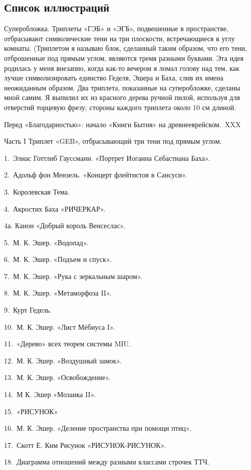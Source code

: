\subsection{Список иллюстраций}

Суперобложка. Триплеты «ГЭБ» и «ЭГБ», подвешенные в пространстве, отбрасывают символические тени на три плоскости, встречающиеся в углу комнаты. (Триплетом я называю блок, сделанный таким образом, что его тени, отброшенные под прямым углом, являются тремя разными буквами. Эта идея родилась у меня внезапно, когда как-то вечером я ломал голову над тем, как лучше символизировать единство Геделя, Эшера и Баха, слив их имена неожиданным образом. Два триплета, показанные на суперобложке, сделаны мной самим. Я выпилил их из красного дерева ручной пилой, используя для отверстий торцевую фрезу; стороны каждого триплета около 10 см длиной.

Перед «Благодарностью»: начало «Книги Бытия» на древнееврейском.~XXX

Часть I Триплет «GEB», отбрасывающий три тени под прямым углом.

1.~Элиас Готтлиб Гауссманн. «Портрет Иоганна Себастиана Баха».

2.~Адольф фон Мензель. «Концерт флейтистов в Сансуси».

3.~Королевская Тема.

4.~Акростих Баха «РИЧЕРКАР».

4а. Канон «Добрый король Венсеслас».

5.~М. К. Эшер. «Водопад».

6.~М. К. Эшер. «Подъем и спуск».

7.~М. К. Эшер. «Рука с зеркальным шаром».

8.~М. К. Эшер. «Метаморфоза II».

9.~Курт Гедель.

10.~М. К. Эшер. «Лист Мёбиуса I».

11.~«Дерево» всех теорем системы MIU.

12.~М. К. Эшер. «Воздушный замок».

13.~М. К. Эшер. «Освобождение».

14.~М К. Эшер «Мозаика II».

15.~«РИСУНОК»

16.~М. К. Эшер. «Деление пространства при помощи птиц».

17.~Скотт Е. Ким Рисунок «РИСУНОК-РИСУНОК».

18.~Диаграмма отношений между разными классами строчек ТТЧ.

